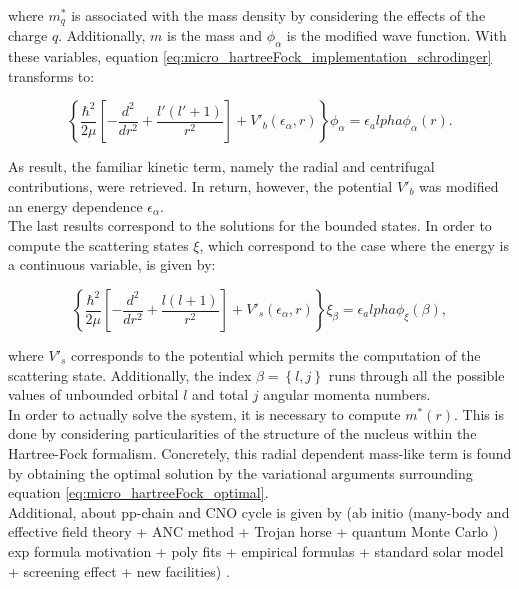 \documentclass[openany]{book}
\begin{document}
where $m^{*}_q$ is associated with the mass density by considering the effects of the charge $q$. Additionally, $m$ is the mass and $\phi_\alpha$ is the modified wave function. With these variables, equation \ref{eq:micro_hartreeFock_implementation_schrodinger} transforms to:

\begin{equation}\label{eq:micro_hartreeFock_implementation_schrodinger_modified}
	\left \{ \frac{\hbar^2}{2\mu} \left [ - \frac{d^2}{dr^2} + \frac{l'(l'+1)}{r^2} \right] + V'_b(\epsilon_\alpha, r) \right \} \phi_\alpha = \epsilon_alpha \phi_\alpha(r).
\end{equation}

As result, the familiar kinetic term, namely the radial and centrifugal contributions, were retrieved. In return, however, the potential $V'_b$ was modified an energy dependence $\epsilon_\alpha$. \\

The last results correspond to the solutions for the bounded states. In order to compute the scattering states $\xi$, which correspond to the case where the energy is a continuous variable, is given by: 

\begin{equation}\label{eq:micro_hartreeFock_implementation_schrodinger_scattered}
	\left \{ \frac{\hbar^2}{2\mu} \left [ - \frac{d^2}{dr^2} + \frac{l(l+1)}{r^2} \right] + V'_s(\epsilon_\alpha, r) \right \} \xi_\beta = \epsilon_alpha \phi_\xi(\beta),
\end{equation}

where $V'_s$ corresponds to the potential which permits the computation of the scattering state. Additionally, the index $\beta = \left \{ l, j\right \}$ runs through all the possible values of unbounded orbital $l$ and total $j$ angular momenta numbers. \\

In order to actually solve the system, it is necessary to compute $m^{*}(r)$. This is done by considering particularities of the structure of the nucleus within the Hartree-Fock formalism. Concretely, this radial dependent mass-like term is found by obtaining the optimal solution by the variational arguments surrounding equation \ref{eq:micro_hartreeFock_optimal}. \\


Additional, about pp-chain and CNO cycle  is given by (ab initio (many-body and effective field theory + ANC method + Trojan horse + quantum Monte Carlo ) exp formula motivation + poly fits + empirical formulas +   standard solar model + screening effect + new facilities) \cite{adelberger_garcia_robertson_snover_balantekin_heeger_ramsey-musolf_bemmerer_junghans_bertulani_et_2011}. \\
\end{document}

